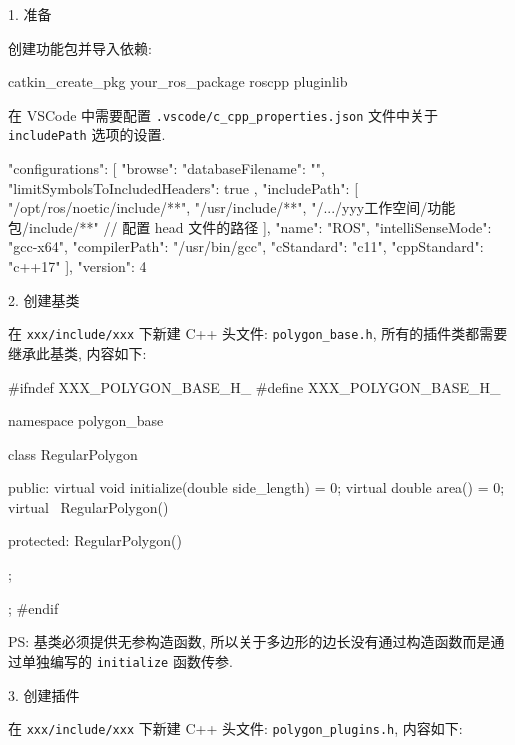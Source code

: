\documentclass[openany, fontset=windowsold]{ctexbook}
\theoremstyle{kaiti}
\theoremstyle{normal}
\begin{document}
1. 准备

创建功能包并导入依赖:

\begin{bash}
  catkin_create_pkg your_ros_package roscpp pluginlib
\end{bash}

在 VSCode 中需要配置 \verb|.vscode/c_cpp_properties.json| 文件中关于 \verb|includePath| 选项的设置.

\begin{bash}
  {
      "configurations": [
          {
              "browse": {
                  "databaseFilename": "",
                  "limitSymbolsToIncludedHeaders": true
              },
              "includePath": [
                  "/opt/ros/noetic/include/**",
                  "/usr/include/**",
                  "/.../yyy工作空间/功能包/include/**" // 配置 head 文件的路径 
              ],
              "name": "ROS",
              "intelliSenseMode": "gcc-x64",
              "compilerPath": "/usr/bin/gcc",
              "cStandard": "c11",
              "cppStandard": "c++17"
          }
      ],
      "version": 4
  }
\end{bash}

2. 创建基类

在 \verb|xxx/include/xxx| 下新建 C++ 头文件: \verb|polygon_base.h|, 所有的插件类都需要继承此基类, 内容如下:

\begin{cpp}
  #ifndef XXX_POLYGON_BASE_H_
  #define XXX_POLYGON_BASE_H_

  namespace polygon_base
  {
    class RegularPolygon
    {
      public:
        virtual void initialize(double side_length) = 0;
        virtual double area() = 0;
        virtual ~RegularPolygon(){}

      protected:
        RegularPolygon(){}
    };
  };
  #endif
\end{cpp}

PS: 基类必须提供无参构造函数, 所以关于多边形的边长没有通过构造函数而是通过单独编写的 \verb|initialize| 函数传参.

3. 创建插件

在 \verb|xxx/include/xxx| 下新建 C++ 头文件: \verb|polygon_plugins.h|, 内容如下:
\end{document}

